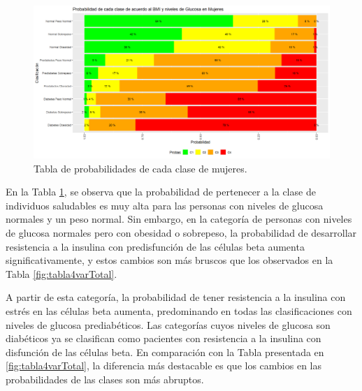 \begin{figure}[H]
    \centering
    \includegraphics[height = 10 cm, width = 0.9 \textwidth]{4img/tablaM.png}
    \caption{Tabla de probabilidades de cada clase de mujeres.}
    \label{fig:tabMujeres}
\end{figure}

En la Tabla \ref{fig:tabMujeres}, se observa que la probabilidad de pertenecer a la clase de individuos saludables es muy alta para las personas con niveles de glucosa normales y un peso normal. Sin embargo, en la categoría de personas con niveles de glucosa normales pero con obesidad o sobrepeso, la probabilidad de desarrollar resistencia a la insulina con predisfunción de las células beta aumenta significativamente, y estos cambios son más bruscos que los observados en la Tabla \ref{fig:tabla4varTotal}.

A partir de esta categoría, la probabilidad de tener resistencia a la insulina con estrés en las células beta aumenta, predominando en todas las clasificaciones con niveles de glucosa prediabéticos. Las categorías cuyos niveles de glucosa son diabéticos ya se clasifican como pacientes con resistencia a la insulina con disfunción de las células beta. En comparación con la Tabla presentada en  \ref{fig:tabla4varTotal}, la diferencia más destacable es que los cambios en las probabilidades de las clases son más abruptos. 



